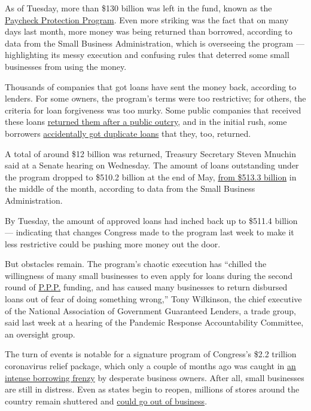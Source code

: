 As of Tuesday, more than \$130 billion was left in the fund, known as
the
\href{https://www.nytimes3xbfgragh.onion/2020/07/06/us/ppp-small-business-loans.html}{Paycheck
Protection Program}. Even more striking was the fact that on many days
last month, more money was being returned than borrowed, according to
data from the Small Business Administration, which is overseeing the
program --- highlighting its messy execution and confusing rules that
deterred some small businesses from using the money.

Thousands of companies that got loans have sent the money back,
according to lenders. For some owners, the program's terms were too
restrictive; for others, the criteria for loan forgiveness was too
murky. Some public companies that received these loans
\href{https://www.nytimes3xbfgragh.onion/2020/05/18/business/ppp-deadline-return-funds-coronavirus.html}{returned
them after a public outcry}, and in the initial rush, some borrowers
\href{https://www.reuters.com/article/us-health-coronavirus-usa-ppp-exclusive/exclusive-us-small-business-program-handed-out-virus-aid-to-many-borrowers-twice-idUSKBN2391S9}{accidentally
got duplicate loans} that they, too, returned.

A total of around \$12 billion was returned, Treasury Secretary Steven
Mnuchin said at a Senate hearing on Wednesday. The amount of loans
outstanding under the program dropped to \$510.2 billion at the end of
May,
\href{https://content.sba.gov/sites/default/files/2020-05/PPP_Report_Net_200518_0.pdf}{from
\$513.3 billion} in the middle of the month, according to data from the
Small Business Administration.

By Tuesday, the amount of approved loans had inched back up to \$511.4
billion --- indicating that changes Congress made to the program last
week to make it less restrictive could be pushing more money out the
door.

But obstacles remain. The program's chaotic execution has ``chilled the
willingness of many small businesses to even apply for loans during the
second round of
\href{https://www.nytimes3xbfgragh.onion/2020/06/30/business/paycheck-protection-program-coronavirus.html}{P.P.P.}
funding, and has caused many businesses to return disbursed loans out of
fear of doing something wrong,'' Tony Wilkinson, the chief executive of
the National Association of Government Guaranteed Lenders, a trade
group, said last week at a hearing of the Pandemic Response
Accountability Committee, an oversight group.

The turn of events is notable for a signature program of Congress's
\$2.2 trillion coronavirus relief package, which only a couple of months
ago was caught in
\href{https://www.nytimes3xbfgragh.onion/2020/04/16/business/coronavirus-sba-loans-out-of-money.html}{an
intense borrowing frenzy} by desperate business owners. After all, small
businesses are still in distress. Even as states begin to reopen,
millions of stores around the country remain shuttered and
\href{https://www.nytimes3xbfgragh.onion/article/small-business-bankruptcy-coronavirus.html}{could
go out of business}.

